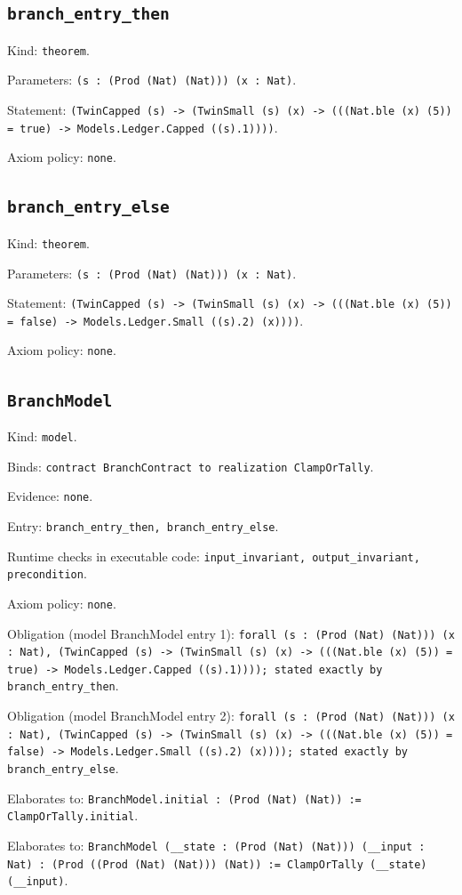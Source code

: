 \documentclass[11pt]{article}
\begin{document}
\subsection*{\texttt{branch\_entry\_then}}
\noindent Kind: \texttt{theorem}.\par
\noindent Parameters: \texttt{(s : (Prod (Nat) (Nat))) (x : Nat)}.\par
\noindent Statement: \texttt{(TwinCapped (s) -> (TwinSmall (s) (x) -> (((Nat.ble (x) (5)) = true) -> Models.Ledger.Capped ((s).1))))}.\par
\noindent Axiom policy: \texttt{none}.\par
\subsection*{\texttt{branch\_entry\_else}}
\noindent Kind: \texttt{theorem}.\par
\noindent Parameters: \texttt{(s : (Prod (Nat) (Nat))) (x : Nat)}.\par
\noindent Statement: \texttt{(TwinCapped (s) -> (TwinSmall (s) (x) -> (((Nat.ble (x) (5)) = false) -> Models.Ledger.Small ((s).2) (x))))}.\par
\noindent Axiom policy: \texttt{none}.\par
\subsection*{\texttt{BranchModel}}
\noindent Kind: \texttt{model}.\par
\noindent Binds: \texttt{contract BranchContract to realization ClampOrTally}.\par
\noindent Evidence: \texttt{none}.\par
\noindent Entry: \texttt{branch\_entry\_then, branch\_entry\_else}.\par
\noindent Runtime checks in executable code: \texttt{input\_invariant, output\_invariant, precondition}.\par
\noindent Axiom policy: \texttt{none}.\par
\noindent Obligation (model BranchModel entry 1): \texttt{forall (s : (Prod (Nat) (Nat))) (x : Nat), (TwinCapped (s) -> (TwinSmall (s) (x) -> (((Nat.ble (x) (5)) = true) -> Models.Ledger.Capped ((s).1)))); stated exactly by branch\_entry\_then}.\par
\noindent Obligation (model BranchModel entry 2): \texttt{forall (s : (Prod (Nat) (Nat))) (x : Nat), (TwinCapped (s) -> (TwinSmall (s) (x) -> (((Nat.ble (x) (5)) = false) -> Models.Ledger.Small ((s).2) (x)))); stated exactly by branch\_entry\_else}.\par
\noindent Elaborates to: \texttt{BranchModel.initial : (Prod (Nat) (Nat)) := ClampOrTally.initial}.\par
\noindent Elaborates to: \texttt{BranchModel (\_\_state : (Prod (Nat) (Nat))) (\_\_input : Nat) : (Prod ((Prod (Nat) (Nat))) (Nat)) := ClampOrTally (\_\_state) (\_\_input)}.\par
\end{document}
